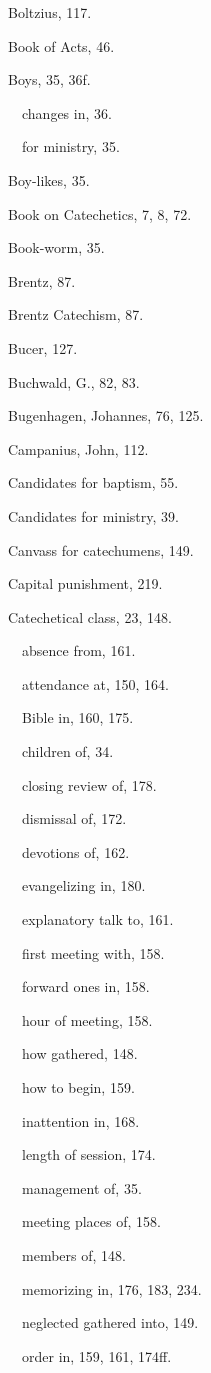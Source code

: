 \begin{originalinhalt}
Boltzius, 117.

Book of Acts, 46.

Boys, 35, 36f.

 changes in, 36.

 for ministry, 35.

Boy-likes, 35.

Book on Catechetics, 7, 8, 72.

Book-worm, 35.

Brentz, 87.

Brentz Catechism, 87.

Bucer, 127.

Buchwald, G., 82, 83.

Bugenhagen, Johannes, 76, 125.

Campanius, John, 112.

Candidates for baptism, 55.

Candidates for ministry, 39.

Canvass for catechumens, 149.

Capital punishment, 219.

Catechetical class, 23, 148.

 absence from, 161.

 attendance at, 150, 164.

 Bible in, 160, 175.

 children of, 34.

 closing review of, 178.

 dismissal of, 172.

 devotions of, 162.

 evangelizing in, 180.

 explanatory talk to, 161.

 first meeting with, 158.

 forward ones in, 158.

 hour of meeting, 158.

 how gathered, 148.

 how to begin, 159.

 inattention in, 168.

 length of session, 174.

 management of, 35.

 meeting places of, 158.

 members of, 148.

 memorizing in, 176, 183, 234.

 neglected gathered into, 149.

 order in, 159, 161, 174ff.


\end{originalinhalt}
